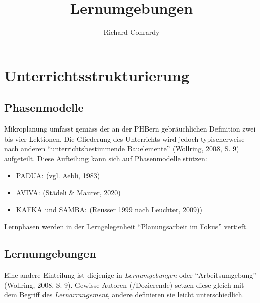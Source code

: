 \documentclass[
  10pt,
  a4paper,
  DIV=11]{scrartcl}
\title{Lernumgebungen}
\author{Richard Conrardy}
\date{}
\providecommand{\tightlist}{%
  \setlength{\itemsep}{0pt}\setlength{\parskip}{0pt}}\usepackage{longtable,booktabs,array}
\begin{document}
\maketitle


\section{Unterrichtsstrukturierung}\label{unterrichtsstrukturierung}

\subsection{Phasenmodelle}\label{phasenmodelle}

Mikroplanung umfasst gemäss der an der PHBern gebräuchlichen Definition
zwei bis vier Lektionen. Die Gliederung des Unterrichts wird jedoch
typischerweise nach anderen ``unterrichtsbestimmende Bauelemente''
(Wollring, 2008, S. 9) aufgeteilt. Diese Aufteilung kann sich auf
Phasenmodelle stützen:

\begin{itemize}
\tightlist
\item
  PADUA: (vgl. Aebli, 1983)
\item
  AVIVA: (Städeli \& Maurer, 2020)
\item
  KAFKA und SAMBA: (Reusser 1999 nach Leuchter, 2009))
\end{itemize}

\begin{tcolorbox}[enhanced jigsaw, title=\textcolor{quarto-callout-tip-color}{\faLightbulb}\hspace{0.5em}{Tipp}, colbacktitle=quarto-callout-tip-color!10!white, breakable, leftrule=.75mm, arc=.35mm, toptitle=1mm, opacityback=0, coltitle=black, left=2mm, opacitybacktitle=0.6, colback=white, bottomtitle=1mm, colframe=quarto-callout-tip-color-frame, titlerule=0mm, rightrule=.15mm, bottomrule=.15mm, toprule=.15mm]

Lernphasen werden in der Lerngelegenheit ``Planungsarbeit im Fokus''
vertieft.

\end{tcolorbox}

\subsection{Lernumgebungen}\label{lernumgebungen}

Eine andere Einteilung ist diejenige in \emph{Lernumgebungen} oder
``Arbeitsumgebung'' (Wollring, 2008, S. 9). Gewisse Autoren
(/Dozierende) setzen diese gleich mit dem Begriff des
\emph{Lernarrangement}, andere definieren sie leicht unterschiedlich.
\end{document}
